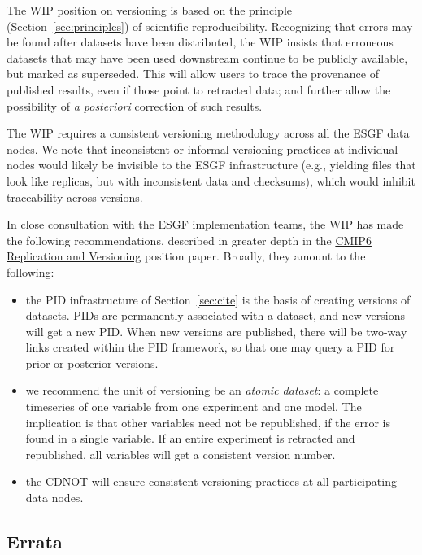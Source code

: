 \documentclass[gmd,manuscript]{copernicus}
\newcommand{\secref}[1] {\mbox{Section  \ref{sec:#1}}}
\begin{document}
The WIP position on versioning is based on the principle
(\secref{principles}) of scientific reproducibility. Recognizing that
errors may be found after datasets have been distributed, the WIP
insists that erroneous datasets that may have been used downstream continue
to be publicly available, but marked as superseded. This will allow
users to trace the provenance of published results, even if those
point to retracted data; and further allow the possibility of \emph{a
  posteriori} correction of such results.

The WIP requires a consistent versioning methodology across all the
ESGF data nodes. We note that inconsistent or informal versioning
practices at individual nodes would likely be invisible to the ESGF
infrastructure (e.g., yielding 
files that look like replicas, but with inconsistent data and
checksums), which would inhibit traceability across versions.

In close consultation with the ESGF implementation teams, the WIP has
made the following recommendations, described in greater depth in the
\href{https://goo.gl/jqWjQ5}{CMIP6 Replication and Versioning}
position paper. Broadly, they amount to the following:

\begin{itemize}
\item the PID infrastructure of \secref{cite} is the basis of creating
  versions of datasets. PIDs are permanently associated with a
  dataset, and new versions will get a new PID. When new versions are
  published, there will be two-way links created within the PID
  framework, so that one may query a PID for prior or posterior versions.
\item we recommend the unit of versioning be an \emph{atomic dataset}:
  a complete timeseries of one variable from one experiment and one
  model. The implication is that other variables need not be
  republished, if the error is found in a single variable. If an
  entire experiment is retracted and republished, all variables will
  get a consistent version number.
\item the CDNOT will ensure consistent versioning practices at all
  participating data nodes.
\end{itemize}


\subsection{Errata}
\label{sec:errata}
\end{document}

